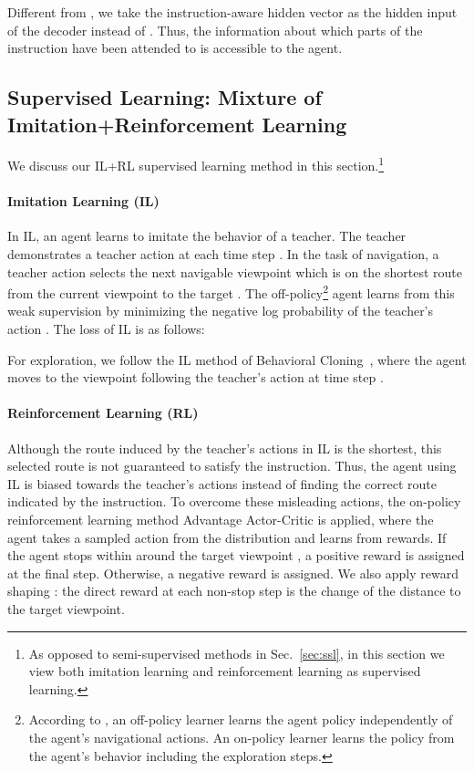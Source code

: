 \documentclass[11pt,a4paper]{article}
\begin{document}
Different from , we take the instruction-aware hidden vector  as the hidden input of the decoder instead of . 
Thus, the information about which parts of the instruction have been attended to is accessible to the agent. 
\subsection{Supervised Learning: Mixture of Imitation+Reinforcement Learning}
\label{sec:rl}
We discuss our IL+RL supervised learning method in this section.\footnote{As opposed to semi-supervised methods in Sec.~\ref{sec:ssl}, in this section we view both imitation learning and reinforcement learning as supervised learning.}

\paragraph{Imitation Learning (IL)}
In IL, an agent learns to imitate the behavior of a teacher. 
The teacher demonstrates a teacher action  at each time step .
In the task of navigation, a teacher action  selects the next navigable viewpoint which is on the shortest route from the current viewpoint to the target .
The off-policy\footnote{According to , an off-policy learner learns the agent policy independently of the agent's navigational actions. An on-policy learner learns the policy from the agent's behavior including the exploration steps.} agent learns from this weak supervision by minimizing the negative log probability of the teacher's action . 
The loss of IL is as follows:

For exploration, we follow the IL method of Behavioral Cloning~\cite{bojarski2016end}, where the agent moves to the viewpoint following the teacher's action  at time step .

\paragraph{Reinforcement Learning (RL)}
Although the route induced by the teacher's actions in IL is the shortest, this selected route is not guaranteed to satisfy the instruction. 
Thus, the agent using IL is biased towards the teacher's actions instead of finding the correct route indicated by the instruction. 
To overcome these misleading actions, the on-policy reinforcement learning method Advantage Actor-Critic \cite{mnih2016asynchronous} is applied,
where the agent takes a sampled action from the distribution  and learns from rewards. 
If the agent stops within  around the target viewpoint , a positive reward  is assigned at the final step. 
Otherwise, a negative reward  is assigned.
We also apply reward shaping \cite{wu2018building}: the direct reward at each non-stop step  is the change of the distance to the target viewpoint. 
\end{document}
